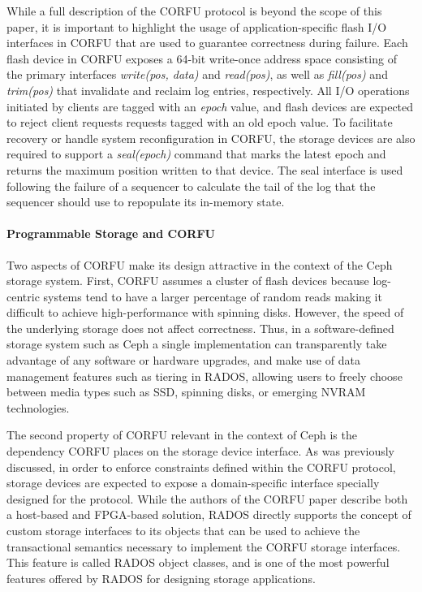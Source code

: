 \documentclass[10pt,twocolumn]{article}
\begin{document}
While a full description of the CORFU protocol is beyond the scope of this
paper, it is important to highlight the usage of application-specific flash
I/O interfaces in CORFU that are used to guarantee correctness during failure.
Each flash device in CORFU exposes a 64-bit write-once address space
consisting of the primary interfaces \emph{write(pos, data)} and
\emph{read(pos)}, as well as \emph{fill(pos)} and \emph{trim(pos)} that
invalidate and reclaim log entries, respectively. All I/O operations initiated
by clients are tagged with an \emph{epoch} value, and flash devices are
expected to reject client requests requests tagged with an old epoch value. To
facilitate recovery or handle system reconfiguration in CORFU, the storage
devices are also required to support a \emph{seal(epoch)} command that marks
the latest epoch and returns the maximum position written to that device. The
seal interface is used following the failure of a sequencer to calculate the
tail of the log that the sequencer should use to repopulate its in-memory
state.

\paragraph*{Programmable Storage and CORFU}
Two aspects of CORFU make its design attractive in the context of
the Ceph storage system. First, CORFU assumes a cluster of flash devices
because log-centric systems tend to have a larger percentage of random reads
making it difficult to achieve high-performance with spinning disks. However,
the speed of the underlying storage does not affect correctness. Thus, in a
software-defined storage system such as Ceph a single implementation can
transparently take advantage of any software or hardware upgrades, and make
use of data management features such as tiering in RADOS, allowing users to
freely choose between media types such as SSD, spinning disks, or emerging
NVRAM technologies.

The second property of CORFU relevant in the context of Ceph is the dependency
CORFU places on the storage device interface.  As was previously discussed, in
order to enforce constraints defined within the CORFU protocol, storage
devices are expected to expose a domain-specific interface specially designed
for the protocol. While the authors of the CORFU paper describe both a
host-based and FPGA-based solution, RADOS directly supports the concept of
custom storage interfaces to its objects that can be used to achieve the
transactional semantics necessary to implement the CORFU storage interfaces.
This feature is called RADOS object classes, and is one of the most powerful
features offered by RADOS for designing storage applications.
\end{document}
